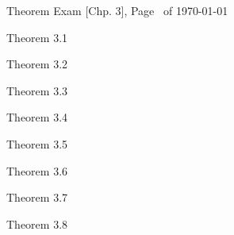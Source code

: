 \documentclass{exam}
\begin{document}
\pagestyle{head}
\runningheadrule
{}
{Theorem Exam [Chp. 3], Page \thepage\ of \numpages}
{\today}

\begin{questions}

\question
Theorem 3.1 \fillin[][3in]
\fillwithdottedlines{1in}

\question
Theorem 3.2 \fillin[][3in]
\fillwithdottedlines{1in}

\question
Theorem 3.3 \fillin[][3in]
\fillwithdottedlines{1in}

\question
Theorem 3.4 \fillin[][3in]
\fillwithdottedlines{1in}

\question
Theorem 3.5 \fillin[][3in]
\fillwithdottedlines{1in}

\question
Theorem 3.6 \fillin[][3in]
\fillwithdottedlines{1in}

\question
Theorem 3.7 \fillin[][3in]
\fillwithdottedlines{1in}

\question
Theorem 3.8 \fillin[][3in]
\fillwithdottedlines{1in}
\end{questions}
\end{document}
